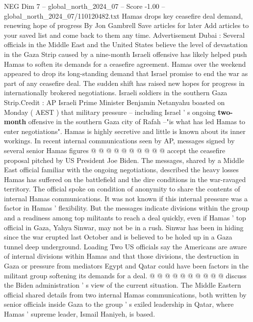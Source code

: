 \begin{textsample}{NEG Dim 7 – global\_north\_2024\_07 – Score -1.00 – global\_north\_2024\_07/110120482.txt}  \label{ex:f7_neg_415}
Hamas drops key ceasefire deal demand, renewing hope of progress By Jon Gambrell Save articles for later Add articles to your saved list and come back to them any time.
Advertisement Dubai : Several officials in the Middle East and the United States believe the level of devastation in the Gaza Strip caused by a nine-month Israeli offensive has likely helped push Hamas to soften its demands for a ceasefire agreement.
Hamas over the weekend appeared to drop its long-standing demand that Israel promise to end the war as part of any ceasefire deal.
The sudden shift has raised new hopes for progress in internationally brokered negotiations.
Israeli soldiers in the southern Gaza Strip.Credit : AP Israeli Prime Minister Benjamin Netanyahu boasted on Monday ( AEST ) that military pressure -- including Israel ' s ongoing \textbf{two-month} offensive in the southern Gaza city of Rafah --"is what has led Hamas to enter negotiations".
Hamas is highly secretive and little is known about its inner workings.
In recent internal communications seen by AP, messages signed by several senior Hamas figures @ @ @ @ @ @ @ @ @ @ accept the ceasefire proposal pitched by US President Joe Biden.
The messages, shared by a Middle East official familiar with the ongoing negotiations, described the heavy losses Hamas has suffered on the battlefield and the dire conditions in the war-ravaged territory.
The official spoke on condition of anonymity to share the contents of internal Hamas communications.
It was not known if this internal pressure was a factor in Hamas ' flexibility.
But the messages indicate divisions within the group and a readiness among top militants to reach a deal quickly, even if Hamas ' top official in Gaza, Yahya Sinwar, may not be in a rush.
Sinwar has been in hiding since the war erupted last October and is believed to be holed up in a Gaza tunnel deep underground.
Loading Two US officials say the Americans are aware of internal divisions within Hamas and that those divisions, the destruction in Gaza or pressure from mediators Egypt and Qatar could have been factors in the militant group softening its demands for a deal. @ @ @ @ @ @ @ @ @ @ discuss the Biden administration ' s view of the current situation.
The Middle Eastern official shared details from two internal Hamas communications, both written by senior officials inside Gaza to the group ' s exiled leadership in Qatar, where Hamas ' supreme leader, Ismail Haniyeh, is based.

\end{textsample}
